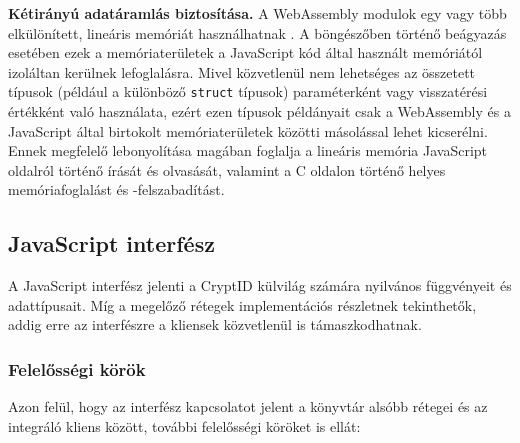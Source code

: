 \begin{outdentlist}
    \item[]\textbf{Kétirányú adatáramlás biztosítása.}
    A WebAssembly modulok egy vagy több elkülönített, lineáris memóriát használhatnak \cite{WebAssemblySpecification}. A böngészőben történő beágyazás esetében ezek a memóriaterületek a JavaScript kód által használt memóriától izoláltan kerülnek lefoglalásra. Mivel közvetlenül nem lehetséges az összetett típusok (például a különböző \texttt{struct} típusok) paraméterként vagy visszatérési értékként való használata, ezért ezen típusok példányait csak a WebAssembly és a JavaScript által birtokolt memóriaterületek közötti másolással lehet kicserélni. Ennek megfelelő lebonyolítása magában foglalja a lineáris memória JavaScript oldalról történő írását és olvasását, valamint a C oldalon történő helyes memóriafoglalást és -felszabadítást.
\end{outdentlist}

\subsection{JavaScript interfész}

A JavaScript interfész jelenti a CryptID külvilág számára nyilvános függvényeit és adattípusait. Míg a megelőző rétegek implementációs részletnek tekinthetők, addig erre az interfészre a kliensek közvetlenül is támaszkodhatnak. 

\subsubsection{Felelősségi körök}

Azon felül, hogy az interfész kapcsolatot jelent a könyvtár alsóbb rétegei és az integráló kliens között, további felelősségi köröket is ellát:

